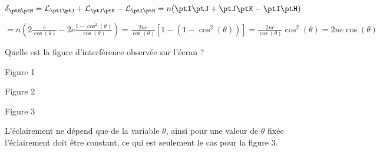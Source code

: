 		
\begin{corrige}
	$\delta_{\ptS \ptM}=\mathcal{L}_{\ptI \ptJ}+\mathcal{L}_{\ptJ \ptK}-\mathcal{L}_{\ptI \ptH}=n(\ptI \ptJ+\ptJ \ptK-\ptI \ptH)$

	$= n\left( 2 \frac{e}{\cos(\theta)} - 2e \frac{1-\cos^2(\theta)}{\cos(\theta)} \right) = \frac{2ne}{\cos(\theta)} \left[1-\left(1-\cos^2(\theta)\right)\right]=\frac{2ne}{\cos(\theta)} \cos^2(\theta)=2ne\cos(\theta)$
\end{corrige}
		




\begin{enonce}
	Quelle est la figure d'interférence observée sur l'écran ?
	\begin{listeQCM3Colonnes}
		\item Figure 1
		\item Figure 2
		\item Figure 3
		\end{listeQCM3Colonnes}
\end{enonce}
	
	
\begin{corrige}
		L'éclairement ne dépend que de la variable $\theta$, ainsi pour une valeur de $\theta$ fixée l'éclairement doit être constant, ce qui est seulement le cas pour la figure 3.
\end{corrige}
	

\finEntrainement







\hauteurLargeurCadreReponse		{6mm}{3.5cm}
\initialisationEntrainement



